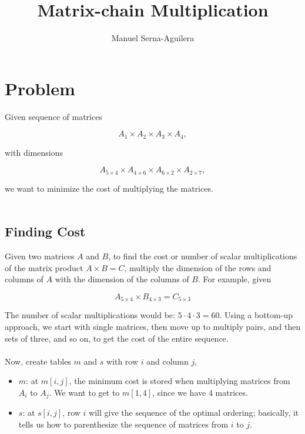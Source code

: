 \documentclass{article}
\title{Matrix-chain Multiplication}
\author{Manuel Serna-Aguilera}
\date{}
\begin{document}
\maketitle

\section*{Problem}
Given sequence of matrices

\begin{equation*}
    A_1 \times A_2 \times A_3 \times A_4,
\end{equation*}

with dimensions

\begin{equation*}
    A_{5\times4} \times A_{4\times6} \times A_{6\times2} \times A_{2\times7},
\end{equation*}

we want to minimize the cost of multiplying the matrices. 
\\ \\
\subsection*{Finding Cost}
Given two matrices $A$ and $B$, to find the cost or number of scalar multiplications of the matrix product $A \times B = C$, multiply the dimension of the rows and columns of $A$ with the dimension of the columns of $B$. For example, given 

\begin{equation*}
    A_{5 \times 4} \times B_{4 \times 3} = C_{5 \times 3}
\end{equation*}

The number of scalar multiplications would be: $5 \cdot 4 \cdot 3 = 60$. Using a bottom-up approach, we start with single matrices, then move up to multiply pairs, and then sets of three, and so on, to get the cost of the entire sequence.
\\ \\
Now, create tables $m$ and $s$ with row $i$ and column $j$,
\begin{itemize}
    \item $m$: at $m[i, j]$, the minimum cost is stored when multiplying matrices from $A_i$ to $A_j$. We want to get to $m[1, 4]$, since we have $4$ matrices.
    
    \item $s$: at $s[i, j]$, row $i$ will give the sequence of the optimal ordering; basically, it tells us how to parenthesize the sequence of matrices from $i$ to $j$.
\end{itemize}
\end{document}
